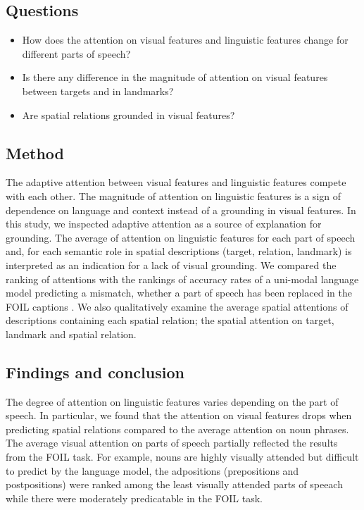 \subsection{Questions}
\begin{itemize}
	\item How does the attention on visual features and linguistic features change for different parts of speech?
	\item Is there any difference in the magnitude of attention on visual features between targets and in landmarks?
	\item Are spatial relations grounded in visual features? %
\end{itemize}

\subsection{Method}
The adaptive attention between visual features and linguistic features compete with each other. 
The magnitude of attention on linguistic features is a sign of dependence on language and context instead of a grounding in visual features.
In this study, we inspected adaptive attention as a source of explanation for grounding. 
The average of attention on linguistic features for each part of speech and, for each semantic role in spatial descriptions (target, relation, landmark) is interpreted as an indication for a lack of visual grounding.
We compared the 
ranking
of attentions with the rankings of accuracy rates of a uni-modal language model predicting a mismatch, whether a part of speech has been replaced in the FOIL captions \citep{shekhar2017vision}. %
We also qualitatively examine the average spatial attentions of descriptions containing each spatial relation; the spatial attention on target, landmark and spatial relation.

\subsection{Findings and conclusion}

The degree of attention on linguistic features varies depending on the part of speech. In particular, we found that the attention on visual features drops when predicting spatial relations compared to the average attention on noun phrases. 
The average visual attention on parts of speech partially reflected the results from the FOIL task. For example, nouns are highly visually attended but difficult to predict by the language model, the adpositions (prepositions and postpositions) were ranked among the least visually attended parts of speeach while there were moderately predicatable in the FOIL task.

